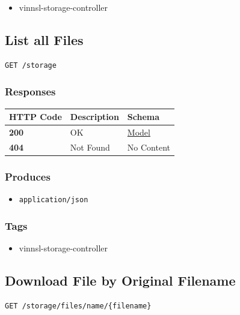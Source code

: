 \begin{itemize}
\tightlist
\item
  vinnsl-storage-controller
\end{itemize}

\subsection{List all Files}\label{list-all-files}

\begin{verbatim}
GET /storage
\end{verbatim}

\subsubsection{Responses}\label{responses-16}

\begin{longtable}[]{@{}lll@{}}
\toprule
HTTP Code & Description & Schema\tabularnewline
\midrule
\endhead
\textbf{200} & OK & \protect\hyperlink{model}{Model}\tabularnewline
\textbf{404} & Not Found & No Content\tabularnewline
\bottomrule
\end{longtable}

\subsubsection{Produces}\label{produces-16}

\begin{itemize}
\tightlist
\item
  \texttt{application/json}
\end{itemize}

\subsubsection{Tags}\label{tags-16}

\begin{itemize}
\tightlist
\item
  vinnsl-storage-controller
\end{itemize}

\subsection{Download File by Original
Filename}\label{download-file-by-original-filename}

\begin{verbatim}
GET /storage/files/name/{filename}
\end{verbatim}


